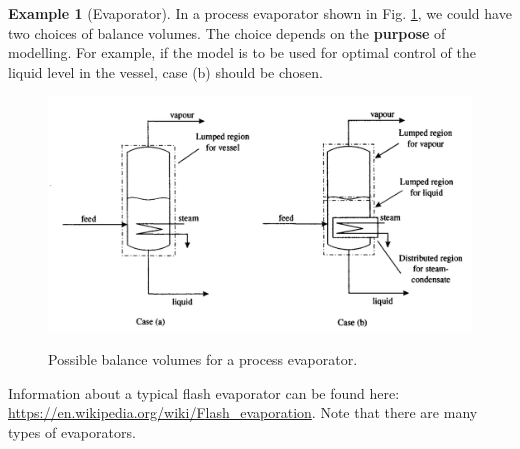 \documentclass[a4paper,11pt]{article}
\theoremstyle{definition}
\newtheorem{exmp}{Example}[section]
\begin{document}
\begin{exmp}[Evaporator]
\label{exmp:evap}
In a process evaporator shown in Fig. \ref{fig:evap}, we could have two choices of balance volumes.
The choice depends on the \textbf{purpose} of modelling. For example, if the model is to be used
for optimal control of the liquid level in the vessel, case (b) should be chosen.

\begin{figure} [!h]
 \begin{center}
	\includegraphics[width=.7\textwidth]{Evap}\\
 \end{center}
 \caption{Possible balance volumes for a process evaporator.} 
 \label{fig:evap}
\end{figure}

Information about a typical flash evaporator can be found here:
\url{https://en.wikipedia.org/wiki/Flash_evaporation}.
Note that there are many types of evaporators.

\end{exmp}
\end{document}
